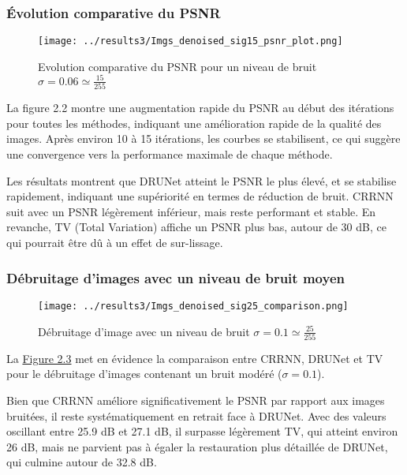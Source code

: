 \documentclass[a4paper, 12pt]{report} %
\begin{document}
\subsubsection{Évolution comparative du PSNR}
\begin{figure}[H]
\centering
\begin{adjustbox}{width=1.1\linewidth, totalheight=0.47 \textheight, angle=0, scale= 0.85, minipage= 4.2\linewidth, margin= 0}
    \texttt{[image: ../results3/Imgs\_denoised\_sig15\_psnr\_plot.png]}
\end{adjustbox}
   \caption{Evolution comparative du PSNR pour un niveau de bruit  $\sigma = 0.06 \simeq \frac{15}{255}$}
    \label{fig:13}
\end{figure}

La figure 2.2 montre une augmentation rapide du PSNR au début des itérations pour toutes les méthodes, indiquant une amélioration rapide de la qualité des images. Après environ 10 à 15 itérations, les courbes se stabilisent, ce qui suggère une convergence vers la performance maximale de chaque méthode.

Les résultats montrent que DRUNet atteint le PSNR le plus élevé, et se stabilise rapidement, indiquant une supériorité en termes de réduction de bruit. CRRNN suit avec un PSNR légèrement inférieur, mais reste performant et stable. En revanche, TV (Total Variation) affiche un PSNR plus bas, autour de 30 dB, ce qui pourrait être dû à un effet de sur-lissage.

\subsubsection{Débruitage d'images avec un niveau de bruit moyen}
\begin{figure}[H]
\centering
\begin{adjustbox}{width=1.1 \linewidth, totalheight=0.47 \textheight, angle=0, scale= 0.85, minipage= 4.2\linewidth, margin= 0}
    \texttt{[image: ../results3/Imgs\_denoised\_sig25\_comparison.png]}
\end{adjustbox}
    \caption{Débruitage d'image avec un niveau de bruit  $\sigma = 0.1 \simeq \frac{25}{255}$}
    \label{fig:14}
\end{figure}

La \hyperref[fig:14]{Figure 2.3} met en évidence la comparaison entre CRRNN, DRUNet et TV pour le débruitage d’images contenant un bruit modéré (\(\sigma = 0.1\)). 

Bien que CRRNN améliore significativement le PSNR par rapport aux images bruitées, il reste systématiquement en retrait face à DRUNet. Avec des valeurs oscillant entre 25.9 dB et 27.1 dB, il surpasse légèrement TV, qui atteint environ 26 dB, mais ne parvient pas à égaler la restauration plus détaillée de DRUNet, qui culmine autour de 32.8 dB.
\end{document}
